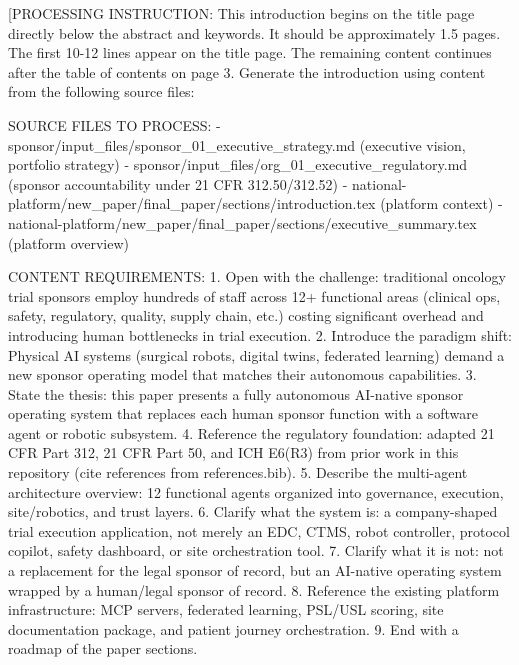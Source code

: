 
[PROCESSING INSTRUCTION: This introduction begins on the title page directly below the abstract and
keywords. It should be approximately 1.5 pages. The first 10-12 lines appear on the title page. The
remaining content continues after the table of contents on page 3. Generate the introduction using
content from the following source files:

SOURCE FILES TO PROCESS:
- sponsor/input\_files/sponsor\_01\_executive\_strategy.md (executive vision, portfolio strategy)
- sponsor/input\_files/org\_01\_executive\_regulatory.md (sponsor accountability under 21 CFR 312.50/312.52)
- national-platform/new\_paper/final\_paper/sections/introduction.tex (platform context)
- national-platform/new\_paper/final\_paper/sections/executive\_summary.tex (platform overview)

CONTENT REQUIREMENTS:
1. Open with the challenge: traditional oncology trial sponsors employ hundreds of staff across
   12+ functional areas (clinical ops, safety, regulatory, quality, supply chain, etc.) costing
   significant overhead and introducing human bottlenecks in trial execution.
2. Introduce the paradigm shift: Physical AI systems (surgical robots, digital twins, federated
   learning) demand a new sponsor operating model that matches their autonomous capabilities.
3. State the thesis: this paper presents a fully autonomous AI-native sponsor operating system
   that replaces each human sponsor function with a software agent or robotic subsystem.
4. Reference the regulatory foundation: adapted 21 CFR Part 312, 21 CFR Part 50, and ICH E6(R3)
   from prior work in this repository (cite references from references.bib).
5. Describe the multi-agent architecture overview: 12 functional agents organized into governance,
   execution, site/robotics, and trust layers.
6. Clarify what the system is: a company-shaped trial execution application, not merely an EDC,
   CTMS, robot controller, protocol copilot, safety dashboard, or site orchestration tool.
7. Clarify what it is not: not a replacement for the legal sponsor of record, but an AI-native
   operating system wrapped by a human/legal sponsor of record.
8. Reference the existing platform infrastructure: MCP servers, federated learning, PSL/USL scoring,
   site documentation package, and patient journey orchestration.
9. End with a roadmap of the paper sections.

